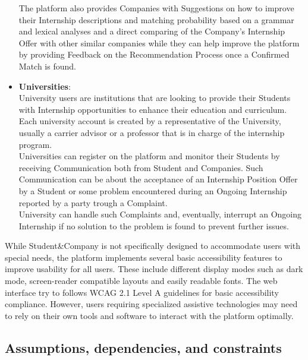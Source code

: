 \begin{itemize}
    The platform also provides Companies with Suggestions on how to improve their Internship descriptions and matching probability based on a grammar and lexical analyses and a direct comparing of the Company's Internship Offer with other similar companies while they can help improve the platform by providing Feedback on the Recommendation Process once a Confirmed Match is found.
  \item \textbf{Universities}:\\
    University users are institutions that are looking to provide their Students with Internship opportunities to enhance their education and curriculum. Each university account is created by a representative of the University, usually a carrier advisor or a professor that is in charge of the internship program.\\
    Universities can register on the platform and monitor their Students by receiving Communication both from Student and Companies. Such Communication can be about the acceptance of an Internship Position Offer by a Student or some problem encountered during an Ongoing Internship reported by a party trough a Complaint. \\
    University can handle such Complaints and, eventually, interrupt an Ongoing Internship if no solution to the problem is found to prevent further issues.
\end{itemize}
While Student\&Company is not specifically designed to accommodate users with special needs, the platform implements several basic accessibility features to improve usability for all users. These include different display modes such as dark mode, screen-reader compatible layouts and easily readable fonts.
The web interface try to follows WCAG 2.1 Level A guidelines for basic accessibility compliance. However, users requiring specialized assistive technologies may need to rely on their own tools and software to interact with the platform optimally.

\subsection{Assumptions, dependencies, and constraints}

